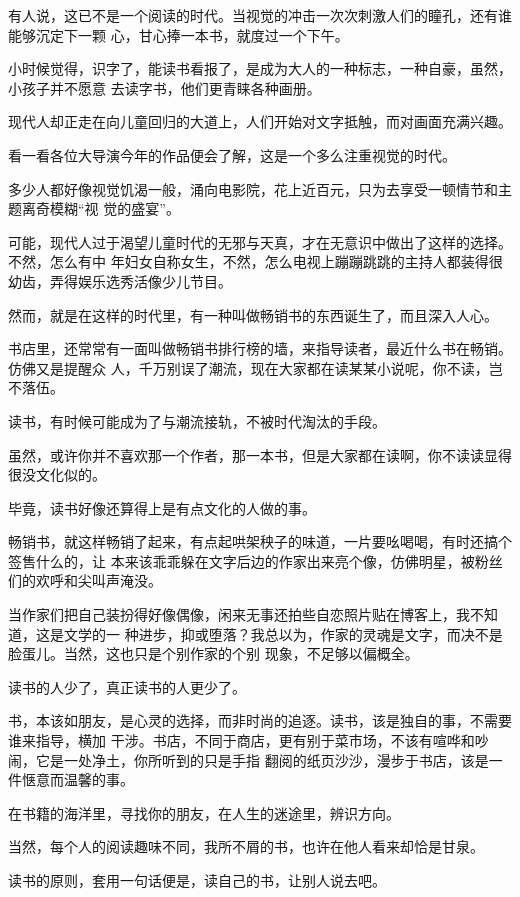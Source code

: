 \documentclass[12pt,a4paper]{article}
\begin{document}
		有人说，这已不是一个阅读的时代。当视觉的冲击一次次刺激人们的瞳孔，还有谁能够沉定下一颗
	心，甘心捧一本书，就度过一个下午。

		小时候觉得，识字了，能读书看报了，是成为大人的一种标志，一种自豪，虽然，小孩子并不愿意
	去读字书，他们更青睐各种画册。

		现代人却正走在向儿童回归的大道上，人们开始对文字抵触，而对画面充满兴趣。\par
		看一看各位大导演今年的作品便会了解，这是一个多么注重视觉的时代。

		多少人都好像视觉饥渴一般，涌向电影院，花上近百元，只为去享受一顿情节和主题离奇模糊“视
	觉的盛宴”。

		可能，现代人过于渴望儿童时代的无邪与天真，才在无意识中做出了这样的选择。不然，怎么有中
	年妇女自称女生，不然，怎么电视上蹦蹦跳跳的主持人都装得很幼齿，弄得娱乐选秀活像少儿节目。

		然而，就是在这样的时代里，有一种叫做畅销书的东西诞生了，而且深入人心。

		书店里，还常常有一面叫做畅销书排行榜的墙，来指导读者，最近什么书在畅销。仿佛又是提醒众
	人，千万别误了潮流，现在大家都在读某某小说呢，你不读，岂不落伍。

		读书，有时候可能成为了与潮流接轨，不被时代淘汰的手段。\par
		虽然，或许你并不喜欢那一个作者，那一本书，但是大家都在读啊，你不读读显得很没文化似的。\par
		毕竟，读书好像还算得上是有点文化的人做的事。

		畅销书，就这样畅销了起来，有点起哄架秧子的味道，一片要吆喝喝，有时还搞个签售什么的，让
	本来该乖乖躲在文字后边的作家出来亮个像，仿佛明星，被粉丝们的欢呼和尖叫声淹没。

		当作家们把自己装扮得好像偶像，闲来无事还拍些自恋照片贴在博客上，我不知道，这是文学的一
	种进步，抑或堕落？我总以为，作家的灵魂是文字，而决不是脸蛋儿。当然，这也只是个别作家的个别
	现象，不足够以偏概全。

		读书的人少了，真正读书的人更少了。

		书，本该如朋友，是心灵的选择，而非时尚的追逐。读书，该是独自的事，不需要谁来指导，横加
	干涉。书店，不同于商店，更有别于菜市场，不该有喧哗和吵闹，它是一处净土，你所听到的只是手指
	翻阅的纸页沙沙，漫步于书店，该是一件惬意而温馨的事。

		在书籍的海洋里，寻找你的朋友，在人生的迷途里，辨识方向。\par
		当然，每个人的阅读趣味不同，我所不屑的书，也许在他人看来却恰是甘泉。

		读书的原则，套用一句话便是，读自己的书，让别人说去吧。
\end{document}

